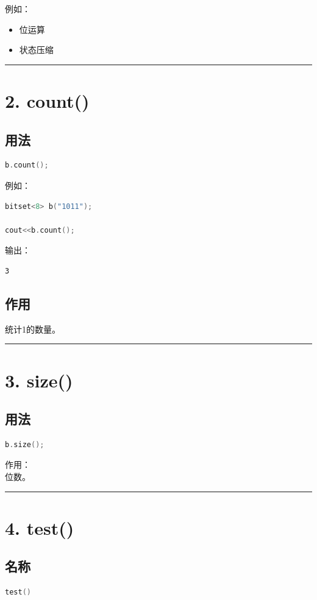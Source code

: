 \documentclass[10pt,twocolumn]{extarticle}
\begin{document}
例如：
\begin{itemize}
    \item 位运算
    \item 状态压缩
\end{itemize}

\noindent\rule{\linewidth}{0.4pt}

\section{2. count()}

\subsection{用法}
\begin{lstlisting}[language=C++]
b.count();
\end{lstlisting}
例如：
\begin{lstlisting}[language=C++]
bitset<8> b("1011");

cout<<b.count();
\end{lstlisting}
输出：
\begin{lstlisting}
3
\end{lstlisting}

\subsection{作用}
统计1的数量。

\noindent\rule{\linewidth}{0.4pt}

\section{3. size()}

\subsection{用法}
\begin{lstlisting}[language=C++]
b.size();
\end{lstlisting}
作用：\\
位数。

\noindent\rule{\linewidth}{0.4pt}

\section{4. test()}

\subsection{名称}
\begin{lstlisting}[language=C++]
test()
\end{lstlisting}
\end{document}
